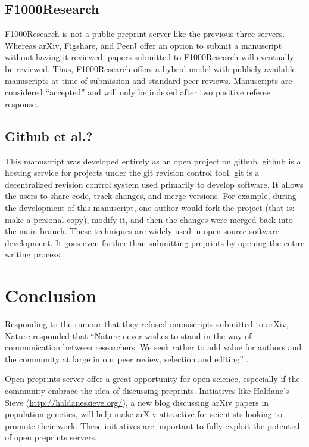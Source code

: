 \documentclass[letterpaper,twocolumn,superscriptaddress,showkeys]{revtex4-1}
\begin{document}

\subsection{F1000Research}

F1000Research is not a public preprint server like the previous three servers.
Whereas arXiv, Figshare, and PeerJ offer an option to submit a manuscript
without having it reviewed, papers submitted to F1000Research will eventually be
reviewed. Thus, F1000Research offers a hybrid model with publicly available
manuscripts at time of submission and standard peer-reviews. Manuscripts are
considered ``accepted'' and will only be indexed after two positive referee
response.

\subsection{Github et al.?}

This manuscript was developed entirely as an open project on github. github is a
hosting service for projects under the git revision control tool. git is a
decentralized revision control system used primarily to develop software. It
allows the users to share code, track changes, and merge versions. For example,
during the development of this manuscript, one author would fork the project
(that is: make a personal copy), modify it, and then the changes were merged
back into the main branch. These techniques are widely used in open source
software development. It goes even farther than submitting preprints by opening
the entire writing process. 

\section{Conclusion}

Responding to the rumour that they refused manuscripts submitted to arXiv,
Nature responded that ``Nature never wishes to stand in the way of communication
between researchers. We seek rather to add value for authors and the community
at large in our peer review, selection and editing'' \cite{nat05}.

Open preprints server offer a great opportunity for open science, especially if
the community embrace the idea of discussing preprints. Initiatives like
Haldane's Sieve (\href{http://haldanessieve.org/}{http://haldanessieve.org/}), a
new blog discussing arXiv papers in population genetics, will help make arXiv
attractive for scientists looking to promote their work. These initiatives are
important to fully exploit the potential of open preprints servers.
\end{document}
